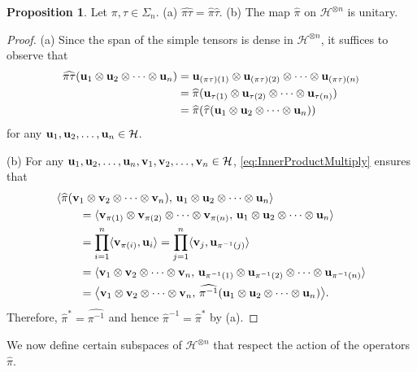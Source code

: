 \documentclass[10pt,reqno]{amsart}
\newcommand{\0}{{\color{lightgray}0}}
\newcommand{\h}{\mathcal{H}}
\renewcommand{\hat}{\widehat}
\renewcommand{\vec}[1]{{\bf #1}}
\theoremstyle{definition}
\newtheorem{Proposition}[equation]{Proposition}
\numberwithin{equation}{section}
\begin{document}
\begin{Proposition}\label{Proposition:Unitary}
Let $\pi,\tau \in \Sigma_n$.
(a) $\hat{\pi \tau} = \hat{\pi} \hat{\tau}$.
(b) The map $\hat{\pi}$ on $\h^{\otimes n}$ is unitary.
\end{Proposition}

\begin{proof}
(a) Since the span of the simple tensors is dense in $\h^{\otimes n}$, it suffices to observe that
\begin{align*}
\hat{\pi \tau }(\vec{u}_1 \otimes \vec{u}_2 \otimes \cdots \otimes \vec{u}_n )
&=\vec{u}_{(\pi \tau) (1)} \otimes \vec{u}_{(\pi \tau) (2)}\otimes \cdots \otimes \vec{u}_{(\pi \tau) (n)} \\
&=\hat{\pi} (\vec{u}_{ \tau (1)} \otimes \vec{u}_{\tau (2)}\otimes \cdots \otimes \vec{u}_{ \tau (n)}) \\
&=\hat{\pi} ( \hat{\tau} (\vec{u}_1 \otimes \vec{u}_2 \otimes \cdots \otimes \vec{u}_n ) )
\end{align*}
for any $ \vec{u}_1,\vec{u}_2,\ldots, \vec{u}_{n} \in \h$.

\medskip\noindent(b) For any $ \vec{u}_1,\vec{u}_2,\ldots, \vec{u}_{n},\vec{v}_1, \vec{v}_2 ,\ldots, \vec{v}_n \in \h$,
\eqref{eq:InnerProductMultiply} ensures that
\begin{align*}
& \langle\hat{\pi}(\vec{v}_1\otimes \vec{v}_2\otimes \cdots \otimes \vec{v}_n), \, \vec{u}_1 \otimes \vec{u}_2 \otimes \cdots \otimes \vec{u}_n\rangle \\
&\qquad=\langle\vec{v}_{\pi(1)}\otimes \vec{v}_{\pi(2)}\otimes \cdots \otimes \vec{v}_{\pi(n)}, \, \vec{u}_1 \otimes \vec{u}_2 \otimes \cdots \otimes \vec{u}_n\rangle \\
&\qquad= \prod_{i=1}^{n} \langle \vec{v}_{\pi(i)}, \vec{u}_i \rangle 
= \prod_{j=1}^{n} \langle \vec{v}_{j}, \vec{u}_{\pi^{-1}(j)} \rangle \\
&\qquad=\langle\vec{v}_{1}\otimes \vec{v}_2 \otimes \cdots \otimes \vec{v}_{n}, \, \vec{u}_{\pi^{-1}(1)} \otimes \vec{u}_{\pi^{-1}(2)} \otimes \cdots \otimes \vec{u}_{\pi^{-1}(n)}\rangle \\
&\qquad= \big\langle\vec{v}_1\otimes \vec{v}_2 \otimes \cdots \otimes \vec{v}_n, \, \hat{\pi^{-1}}(\vec{u}_1 \otimes  \vec{u}_2 \otimes \cdots \otimes \vec{u}_n)\big\rangle .
\end{align*}
Therefore, $\hat{\pi}^* = \hat{\pi^{-1}}$ and hence $\hat{\pi}^{-1} = \hat{\pi}^*$ by (a).
\end{proof}

We now define certain subspaces of $\h^{\otimes n}$ that respect
the action of the operators $\hat{\pi}$.
\end{document}
